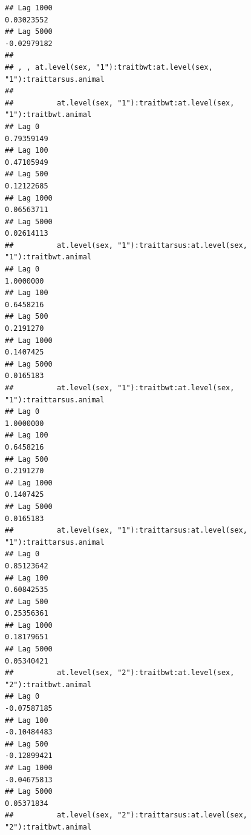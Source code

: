 \documentclass[
  12pt,
]{book}
\begin{document}
\begin{verbatim}
## Lag 1000                                                          0.03023552
## Lag 5000                                                         -0.02979182
## 
## , , at.level(sex, "1"):traitbwt:at.level(sex, "1"):traittarsus.animal
## 
##          at.level(sex, "1"):traitbwt:at.level(sex, "1"):traitbwt.animal
## Lag 0                                                        0.79359149
## Lag 100                                                      0.47105949
## Lag 500                                                      0.12122685
## Lag 1000                                                     0.06563711
## Lag 5000                                                     0.02614113
##          at.level(sex, "1"):traittarsus:at.level(sex, "1"):traitbwt.animal
## Lag 0                                                            1.0000000
## Lag 100                                                          0.6458216
## Lag 500                                                          0.2191270
## Lag 1000                                                         0.1407425
## Lag 5000                                                         0.0165183
##          at.level(sex, "1"):traitbwt:at.level(sex, "1"):traittarsus.animal
## Lag 0                                                            1.0000000
## Lag 100                                                          0.6458216
## Lag 500                                                          0.2191270
## Lag 1000                                                         0.1407425
## Lag 5000                                                         0.0165183
##          at.level(sex, "1"):traittarsus:at.level(sex, "1"):traittarsus.animal
## Lag 0                                                              0.85123642
## Lag 100                                                            0.60842535
## Lag 500                                                            0.25356361
## Lag 1000                                                           0.18179651
## Lag 5000                                                           0.05340421
##          at.level(sex, "2"):traitbwt:at.level(sex, "2"):traitbwt.animal
## Lag 0                                                       -0.07587185
## Lag 100                                                     -0.10484483
## Lag 500                                                     -0.12899421
## Lag 1000                                                    -0.04675813
## Lag 5000                                                     0.05371834
##          at.level(sex, "2"):traittarsus:at.level(sex, "2"):traitbwt.animal

\end{verbatim}
\end{document}
